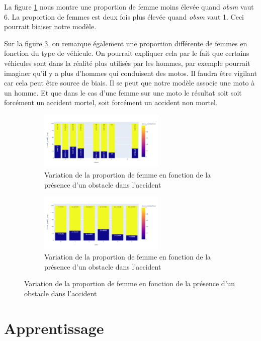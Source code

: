 \documentclass[]{article}
\begin{document}
    La figure \ref{fig:fig_sexe_bivar1} nous montre une proportion de femme moins élevée quand \textit{obsm} vaut 
    6. La proportion de femmes est deux fois plus élevée quand \textit{obsm} vaut 1. Ceci pourrait biaiser notre 
    modèle.
    
    Sur la figure \ref{fig:fig_sexe_bivar2}, on remarque également une proportion différente de femmes 
    en fonction du type de véhicule. On pourrait expliquer cela par le fait que certains véhicules sont 
    dans la réalité plus utilisés par les hommes, par exemple pourrait imaginer qu'il y a plus d'hommes qui 
    conduisent des motos. Il faudra être vigilant car cela peut être source de biais. Il se peut que notre 
    modèle associe une moto à un homme. Et que dans le cas d'une femme sur une moto le résultat soit soit 
    forcément un accident mortel, soit forcément un accident non mortel.

    \begin{figure}[h]
        \begin{subfigure}{6cm}
            \includegraphics[width=6cm]{./img/bivar_sexe.png}
            \caption{Variation de la proportion de femme en fonction de la présence d'un obstacle dans l'accident}
            \label{fig:fig_sexe_bivar1}
        \end{subfigure}
        \begin{subfigure}{6cm}
            \includegraphics[width=6cm]{./img/bivar_sexe2.png}
        \caption{Variation de la proportion de femme en fonction de la présence d'un obstacle dans l'accident}
        \label{fig:fig_sexe_bivar2}
        \end{subfigure}
    \end{figure}

    \section{Apprentissage}
    
\end{document}
